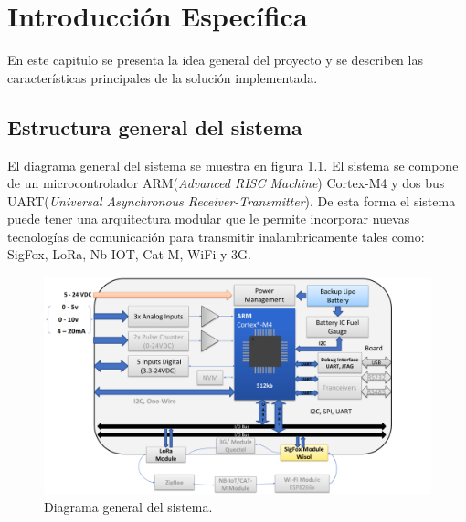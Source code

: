 \chapter{Introducción Específica} %

\label{Chapter2}

En este capitulo se presenta la idea general del proyecto y se describen las características principales de la solución implementada.
\section{Estructura general del sistema}


El diagrama general del sistema se muestra en figura \ref{fig:esquemaGeneral}. El sistema se compone de un microcontrolador ARM(\textit{Advanced RISC Machine}) Cortex\textregistered -M4 y dos bus UART(\textit{Universal Asynchronous Receiver-Transmitter}). De esta forma el sistema puede tener una arquitectura modular que le permite incorporar nuevas tecnologías de comunicación para transmitir inalambricamente tales como: SigFox, LoRa, Nb-IOT, Cat-M, WiFi y 3G.


\begin{figure}[h]

	\centering

	\includegraphics[scale=.35]{./Figures/esquemaGeneral.png}

	\caption{Diagrama general del sistema.}

	\label{fig:esquemaGeneral}

\end{figure}


